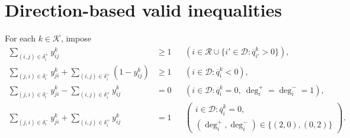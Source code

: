 \documentclass{article}
\begin{document}
\section*{Direction-based valid inequalities}
For each $k\in\mathcal K$, impose
\begin{align}
\sum_{(i,j)\in\delta_i^+}y_{ij}^k&\ge1
&&\left(i\in\mathcal R\cup\{i'\in\mathcal D:\overline q_{i'}^k>0\}\right), \tag{32}\\
\sum_{(j,i)\in\delta_i^-}y_{ji}^k+
\sum_{(i,j)\in\delta_i^+}(1-y_{ij}^k)&\ge1
&&(i\in\mathcal D:\overline q_i^k<0), \tag{33}\\
\sum_{(j,i)\in\delta_i^-}y_{ji}^k-
\sum_{(i,j)\in\delta_i^+}y_{ij}^k&=0
&&(i\in\mathcal D:\overline q_i^k=0,\ \deg_i^+=\deg_i^-=1), \tag{34a}\\
\sum_{(j,i)\in\delta_i^-}y_{ji}^k+
\sum_{(i,j)\in\delta_i^+}y_{ij}^k&=1
&&\left(\begin{array}{l}i\in\mathcal D:\overline q_i^k=0,\\(\deg_i^+,\deg_i^-)\in\{(2,0),(0,2)\}\end{array}\right). \tag{34b}
\end{align}
\end{document}
